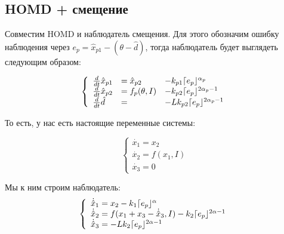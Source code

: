 \documentclass{article}
\DeclarePairedDelimiter{\homd}{\lceil}{\rfloor}
\begin{document}
\subsection{HOMD + смещение}

Совместим HOMD и наблюдатель смещения. Для этого обозначим ошибку наблюдения через $e_p = \hat{x}_{p 1} - (\theta-\hat{d})$, тогда наблюдатель будет выглядеть следующим образом:

$$
\left\{
\begin{array}{lll}
		\frac{d}{dt}\hat{x}_{p 1} &= \hat{x}_{p 2} &- k_{p 1}\homd{e_p}^{\alpha_p} \\
		\frac{d}{dt}\hat{x}_{p 2} &= f_p(\theta,I) &- k_{p 2}\homd{e_p}^{2\alpha_p-1} \\
        \frac{d}{dt}\hat{d} & =                    &-L k_{p 2}\homd{e_p}^{2\alpha_p-1} 
\end{array}
\right.
$$


То есть, у нас есть настоящие переменные системы:

$$
\left\{
\begin{array}{l}
\dot{x_1} = x_2\\
\dot{x_2} = f(x_1, I)\\
\dot{x_3} = 0
\end{array}
\right.
$$


Мы к ним строим наблюдатель:
$$
\left\{
\begin{array}{l}
\dot{\hat{x}}_1 = x_2 - k_1\homd{e_p}^{\alpha} \\
\dot{\hat{x}}_2 = f(x_1+x_3 - \dot{\hat{x}}_3, I) - k_2\homd{e_p}^{2\alpha-1}\\
\dot{\hat{x}}_3 = -L k_2\homd{e_p}^{2\alpha-1}
\end{array}
\right.
$$
\end{document}
